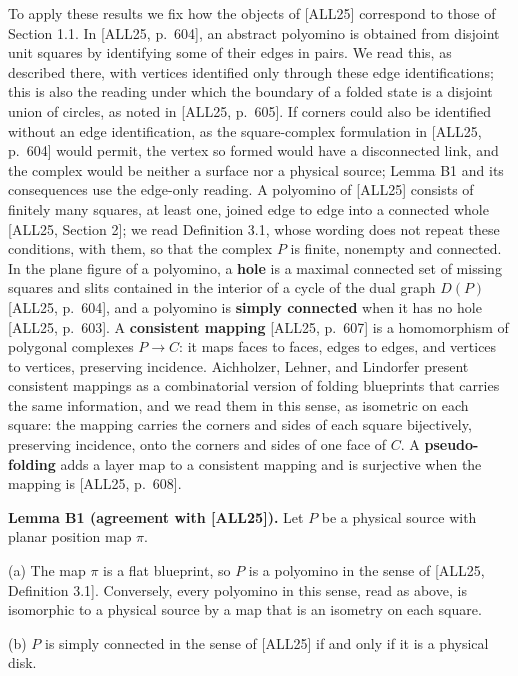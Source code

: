 \documentclass[
  11pt,
]{article}
\newcounter{none} %
\begin{document}
To apply these results we fix how the objects of {[}ALL25{]} correspond
to those of Section 1.1. In {[}ALL25, p.~604{]}, an abstract polyomino
is obtained from disjoint unit squares by identifying some of their
edges in pairs. We read this, as described there, with vertices
identified only through these edge identifications; this is also the
reading under which the boundary of a folded state is a disjoint union
of circles, as noted in {[}ALL25, p.~605{]}. If corners could also be
identified without an edge identification, as the square-complex
formulation in {[}ALL25, p.~604{]} would permit, the vertex so formed
would have a disconnected link, and the complex would be neither a
surface nor a physical source; Lemma B1 and its consequences use the
edge-only reading. A polyomino of {[}ALL25{]} consists of finitely many
squares, at least one, joined edge to edge into a connected whole
{[}ALL25, Section 2{]}; we read Definition 3.1, whose wording does not
repeat these conditions, with them, so that the complex \(P\) is finite,
nonempty and connected. In the plane figure of a polyomino, a
\textbf{hole} is a maximal connected set of missing squares and slits
contained in the interior of a cycle of the dual graph \(D(P)\)
{[}ALL25, p.~604{]}, and a polyomino is \textbf{simply connected} when
it has no hole {[}ALL25, p.~603{]}. A \textbf{consistent mapping}
{[}ALL25, p.~607{]} is a homomorphism of polygonal complexes \(P\to C\):
it maps faces to faces, edges to edges, and vertices to vertices,
preserving incidence. Aichholzer, Lehner, and Lindorfer present
consistent mappings as a combinatorial version of folding blueprints
that carries the same information, and we read them in this sense, as
isometric on each square: the mapping carries the corners and sides of
each square bijectively, preserving incidence, onto the corners and
sides of one face of \(C\). A \textbf{pseudo-folding} adds a layer map
to a consistent mapping and is surjective when the mapping is {[}ALL25,
p.~608{]}.

\textbf{Lemma B1 (agreement with {[}ALL25{]}).} Let \(P\) be a physical
source with planar position map \(\pi\).

(a) The map \(\pi\) is a flat blueprint, so \(P\) is a polyomino in the
sense of {[}ALL25, Definition 3.1{]}. Conversely, every polyomino in
this sense, read as above, is isomorphic to a physical source by a map
that is an isometry on each square.

(b) \(P\) is simply connected in the sense of {[}ALL25{]} if and only if
it is a physical disk.
\end{document}
